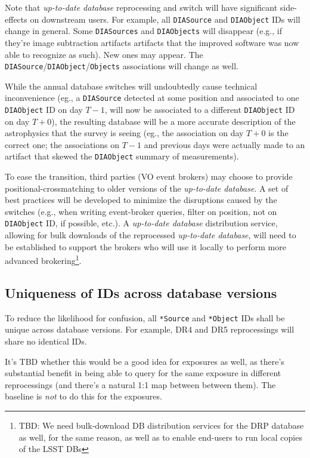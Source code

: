 \documentclass[12pt]{article}
\newcommand{\code}[1]{\texttt{#1}}
\newcommand{\DIASource}{\code{DIASource}\xspace}
\newcommand{\DIASources}{\code{DIASources}\xspace}
\newcommand{\DIAObject}{\code{DIAObject}\xspace}
\newcommand{\DIAObjects}{\code{DIAObjects}\xspace}
\newcommand{\DB}{{\em up-to-date database}\xspace}
\newcommand{\Objects}{\code{Objects}\xspace}
\begin{document}
Note that \DB reprocessing and switch will have significant side-effects on downstream users. For example, all \DIASource and \DIAObject IDs will change in general. Some \DIASources and \DIAObjects will disappear (e.g., if they're image subtraction artifacts artifacts that the improved software was now able to recognize as such). New ones may appear. The \DIASource/\DIAObject/\Objects associations will change as well.

While the annual database switches will undoubtedly cause technical inconvenience (eg., a \DIASource detected at some position and associated to one \DIAObject ID on day $T-1$, will now be associated to a different \DIAObject ID on day $T+0$), the resulting database will be a more accurate description of the astrophysics that the survey is seeing (eg., the association on day $T+0$ is the correct one; the associations on $T-1$ and previous days were actually made to an artifact that skewed the \DIAObject summary of measurements).

To ease the transition, third parties (VO event brokers) may choose to provide positional-crossmatching to older versions of the \DB. A set of best practices will be developed to minimize the disruptions caused by the switches (e.g., when writing event-broker queries, filter on position, not on \DIAObject ID, if possible, etc.). A \DB distribution service, allowing for bulk downloads of the reprocessed \DB, will need to be established to support the brokers who will use it locally to perform more advanced brokering\footnote{TBD: We need bulk-download DB distribution services for the DRP database as well, for the same reason, as well as to enable end-users to run local copies of the LSST DBs}.

\subsection{Uniqueness of IDs across database versions}

To reduce the likelihood for confusion, all \texttt{*Source} and \texttt{*Object}  IDs shall be unique across database versions. For example, DR4 and DR5 reprocessings will share no identical IDs.

It's TBD whether this would be a good idea for exposures as well, as there's substantial benefit in being able to query for the same exposure in different reprocessings (and there's a natural 1:1 map between between them). The baseline is {\em not} to do this for the exposures.
\end{document}

